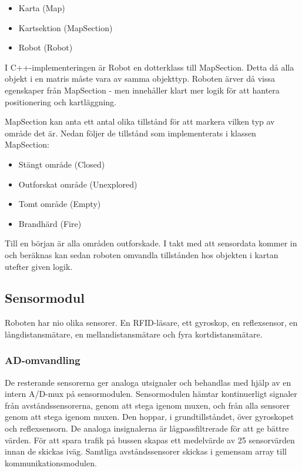 \documentclass[a4paper,12pt,fleqn]{article}
\begin{document}
\begin{itemize}
	\item Karta (Map)
	\item Kartsektion (MapSection)
	\item Robot (Robot)
\end{itemize}

I C++-implementeringen är Robot en dotterklass till MapSection. Detta då alla objekt i en matris måste vara av samma objekttyp. Roboten ärver då vissa egenskaper från MapSection - men innehåller klart mer logik för att hantera positionering och kartläggning. 

MapSection kan anta ett antal olika tillstånd för att markera vilken typ av område det är. Nedan följer de tillstånd som implementerats i klassen MapSection: 

\begin{itemize}
	\item Stängt område (Closed)
	\item Outforskat område (Unexplored)
	\item Tomt område (Empty)
	\item Brandhärd (Fire)
\end{itemize}

Till en början är alla områden outforskade. I takt med att sensordata kommer in och beräknas kan sedan roboten omvandla tillstånden hos objekten i kartan utefter given logik. 

\subsection{Sensormodul}

Roboten har nio olika sensorer. En RFID-läsare, ett gyroskop, en reflexsensor, en långdistansmätare, en mellandistansmätare och fyra kortdistansmätare. 

\subsubsection{AD-omvandling}
De resterande sensorerna ger analoga utsignaler och behandlas med hjälp av en intern A/D-mux på sensormodulen. 
Sensormodulen hämtar kontinuerligt signaler från avståndssensorerna, genom att stega igenom muxen, och från alla sensorer genom att stega igenom muxen. Den hoppar, i grundtillståndet, över gyroskopet och reflexsensorn. De analoga insignalerna är lågpassfiltrerade för att ge bättre värden.
För att spara trafik på bussen skapas ett medelvärde av 25 sensorvärden innan de skickas iväg. Samtliga avståndssensorer skickas i gemensam array till kommunikationsmodulen.
\end{document}
